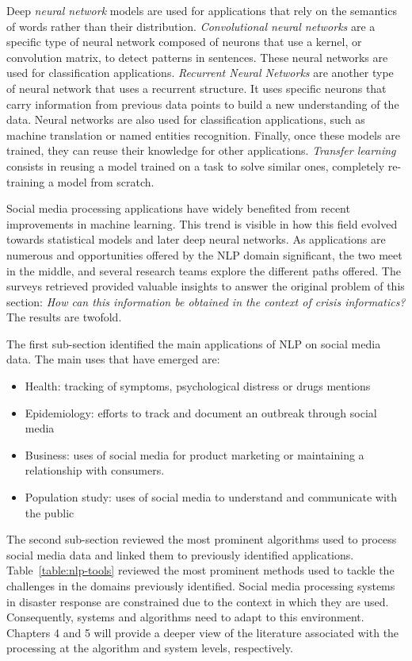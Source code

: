 Deep \emph{neural network} models are used for applications that rely on the semantics of words rather than their distribution.
\emph{Convolutional neural networks} are a specific type of neural network composed of neurons that use a kernel, or convolution matrix, to detect patterns in sentences.
These neural networks are used for classification applications.
\emph{Recurrent Neural Networks} are another type of neural network that uses a recurrent structure.
It uses specific neurons that carry information from previous data points to build a new understanding of the data.
Neural networks are also used for classification applications, such as machine translation or named entities recognition.
Finally, once these models are trained, they can reuse their knowledge for other applications.
\emph{Transfer learning} consists in reusing a model trained on a task to solve similar ones, completely re-training a model from scratch.

Social media processing applications have widely benefited from recent improvements in machine learning.
This trend is visible in how this field evolved towards statistical models and later deep neural networks.
As applications are numerous and opportunities offered by the NLP domain significant, the two meet in the middle, and several research teams explore the different paths offered.
The surveys retrieved provided valuable insights to answer the original problem of this section: \emph{How can this information be obtained in the context of crisis informatics?}
The results are twofold.

The first sub-section identified the main applications of NLP on social media data.
The main uses that have emerged are:

\begin{itemize}
    \item Health: tracking of symptoms, psychological distress or drugs mentions
    \item Epidemiology: efforts to track and document an outbreak through social media
    \item Business: uses of social media for product marketing or maintaining a relationship with consumers.
    \item Population study: uses of social media to understand and communicate with the public
\end{itemize}

The second sub-section reviewed the most prominent algorithms used to process social media data and linked them to previously identified applications.
Table~\ref{table:nlp-tools} reviewed the most prominent methods used to tackle the challenges in the domains previously identified.
Social media processing systems in disaster response are constrained due to the context in which they are used.
Consequently, systems and algorithms need to adapt to this environment.
Chapters 4 and 5 will provide a deeper view of the literature associated with the processing at the algorithm and system levels, respectively.

